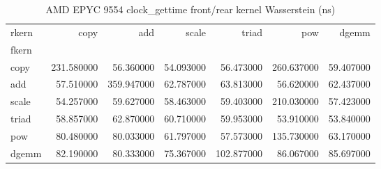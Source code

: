 \begin{table}
\caption{AMD EPYC 9554 clock_gettime front/rear kernel Wasserstein (ns)}
\begin{tabular}{lrrrrrr}
\toprule
rkern & copy & add & scale & triad & pow & dgemm \\
fkern &  &  &  &  &  &  \\
\midrule
copy & 231.580000 & 56.360000 & 54.093000 & 56.473000 & 260.637000 & 59.407000 \\
add & 57.510000 & 359.947000 & 62.787000 & 63.813000 & 56.620000 & 62.437000 \\
scale & 54.257000 & 59.627000 & 58.463000 & 59.403000 & 210.030000 & 57.423000 \\
triad & 58.857000 & 62.870000 & 60.710000 & 59.953000 & 53.910000 & 53.840000 \\
pow & 80.480000 & 80.033000 & 61.797000 & 57.573000 & 135.730000 & 63.170000 \\
dgemm & 82.190000 & 80.333000 & 75.367000 & 102.877000 & 86.067000 & 85.697000 \\
\bottomrule
\end{tabular}
\end{table}
